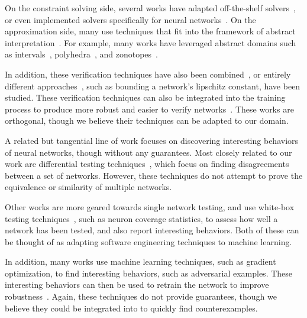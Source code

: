 On the constraint solving side, several works have adapted
off-the-shelf solvers~\cite{CarliniW17, tjeng2019evaluating,
BastaniILVNC16, Ehlers17, baluta2019quantitative}, or even implemented
solvers specifically for neural networks~\cite{KatzBDJK17,
KatzHIJLLSTWZDK19}.
%
On the approximation side, many use techniques that fit into the framework of abstract interpretation~\cite{CousotC77}. For example, many works have leveraged abstract domains such as intervals~\cite{WangPWYJ18, WengZCSHDBD18, zhang2018efficient, JulianKO18}, polyhedra~\cite{Singh2019krelu, SinghGPV19}, and zonotopes~\cite{SinghGPV19iclr, GehrMDTCV18}.


In addition, these verification techniques have also been
combined~\cite{SinghGPV19iclr, WangPWYJ18nips, HuangKWW17}, or
entirely different approaches~\cite{RuanHK18, DvijothamSGMK18,
GopinathKPB18}, such as bounding a network's lipschitz constant, have
been studied. These verification techniques can also be integrated
into the training process to produce more robust and easier to verify
networks~\cite{FischerBDGZV19, MirmanGV18, WongK18,
balunovic2020adversarial}. These works are orthogonal, though we
believe their techniques can be adapted to our domain.


A related but tangential line of work focuses on discovering
interesting behaviors of neural networks, though without any
guarantees.
%
Most closely related to our work are differential testing
techniques~\cite{xie2019diffchaser, PeiCYJ17, MaLLZG18}, which focus
on finding disagreements between a set of networks.
%
However, these techniques do not attempt to prove the equivalence or
similarity of multiple networks.

Other works are more geared towards single network testing, and use
white-box testing techniques~\cite{ma2018deepgauge, xie2019deephunter,
SunWRHKK18, TianPJR18, odena2018tensorfuzz}, such as neuron coverage
statistics, to assess how well a network has been tested, and also
report interesting behaviors. Both of these can be thought of as
adapting software engineering techniques to machine learning.


In addition, many works use machine learning techniques, such as
gradient optimization, to find interesting behaviors, such as
adversarial examples\cite{KurakinGB17a, madry2017towards, NguyenYC15,
XuQE16, Moosavi-Dezfooli16}. These interesting behaviors can then be
used to retrain the network to improve
robustness~\cite{GoodfellowSS15, RaghunathanSL18}. Again, these
techniques do not provide guarantees, though we believe they could be
integrated into \Name{} to quickly find counterexamples.

